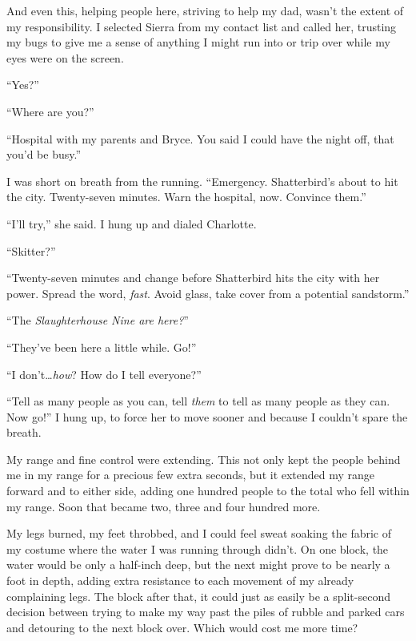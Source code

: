 And even this, helping people here, striving to help my dad, wasn't the extent of my responsibility.  I selected Sierra from my contact list and called her, trusting my bugs to give me a sense of anything I might run into or trip over while my eyes were on the screen.



``Yes?''



``Where are you?''



``Hospital with my parents and Bryce.  You said I could have the night off, that you'd be busy.''



I was short on breath from the running.  ``Emergency.  Shatterbird's about to hit the city.  Twenty-seven minutes.  Warn the hospital, now.  Convince them.''



``I'll try,'' she said.  I hung up and dialed Charlotte.



``Skitter?''



``Twenty-seven minutes and change before Shatterbird hits the city with her power.  Spread the word, \emph{fast}.  Avoid glass, take cover from a potential sandstorm.''



``The \emph{Slaughterhouse Nine are here?}''



``They've been here a little while.  Go!''



``I don't\ldots \emph{how}?  How do I tell everyone?''



``Tell as many people as you can, tell \emph{them} to tell as many people as they can.  Now go!''  I hung up, to force her to move sooner and because I couldn't spare the breath.



My range and fine control were extending.  This not only kept the people behind me in my range for a precious few extra seconds, but it extended my range forward and to either side, adding one hundred people to the total who fell within my range.  Soon that became two, three and four hundred more.



My legs burned, my feet throbbed, and I could feel sweat soaking the fabric of my costume where the water I was running through didn't.  On one block, the water would be only a half-inch deep, but the next might prove to be nearly a foot in depth, adding extra resistance to each movement of my already complaining legs.  The block after that, it could just as easily be a split-second decision between trying to make my way past the piles of rubble and parked cars and detouring to the next block over.  Which would cost me more time?



